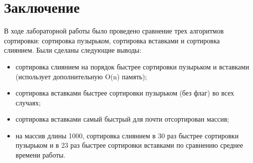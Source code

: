 \chapter*{Заключение}

В ходе лабораторной работы было проведено сравнение трех алгоритмов сортировки:
сортировка пузырьком, сортировка вставками и сортировка слиянием.
Были сделаны следующие выводы:

\begin{itemize}
    \item сортировка слиянием на порядок быстрее сортировки пузырьком и
    вставками (использует дополнительную O(n) память);
    \item сортировка вставками быстрее сортировки пузырьком (без флаг)
    во всех случаях;
    \item сортировка вставками самый быстрый для почти отсортирован массив;
    \item на массив длины 1000, сортировка слиянием в 30 раз быстрее сортировки
    пузырьком и в 23 раз быстрее сортировки вставками по сравнению среднее времени работы.
\end{itemize}
